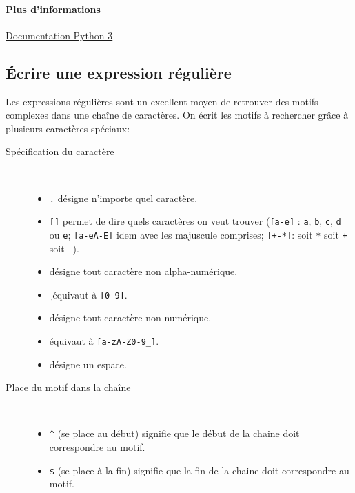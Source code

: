 \documentclass[a4paper, 10pt]{article}
\begin{document}
\paragraph{Plus d'informations} \href{https://docs.python.org/fr/3/library/re.html}{Documentation Python 3}

\subsection{Écrire une expression régulière}
Les expressions régulières sont un excellent moyen de retrouver des motifs complexes dans une chaîne de caractères. On écrit les motifs à rechercher grâce à plusieurs caractères spéciaux:
\begin{description}
    \item [Spécification du caractère]~
          \begin{itemize}
              \item \og\texttt{.}\fg{} désigne n'importe quel caractère.
              \item \og\texttt{[]}\fg{} permet de dire quels caractères on veut trouver (\texttt{[a-e]} : \texttt{a}, \texttt{b}, \texttt{c}, \texttt{d} ou \texttt{e}; \texttt{[a-eA-E]} idem avec les majuscule comprises; \texttt{[+-*]}: soit \texttt{*} soit \texttt{+} soit \texttt{-}).
              \item \og\texttt{\W}\fg{} désigne tout caractère non alpha-numérique.
              \item \og\texttt{\d}\fg{} équivaut à \texttt{[0-9]}.
              \item \og\texttt{\D}\fg{} désigne tout caractère non numérique.
              \item \og\texttt{\w}\fg{} équivaut à \texttt{[a-zA-Z0-9_]}.
              \item \og\texttt{\s}\fg{} désigne un espace.
          \end{itemize}
          \item [Place du motif dans la chaîne]~
          \begin{itemize}
            \item \og\texttt{^}\fg{} (se place au début) signifie que le début de la chaine doit correspondre au motif.
              \item \og\texttt{\$}\fg{} (se place à la fin) signifie que la fin de la chaine doit correspondre au motif.

\end{itemize}
\end{description}
\end{document}

